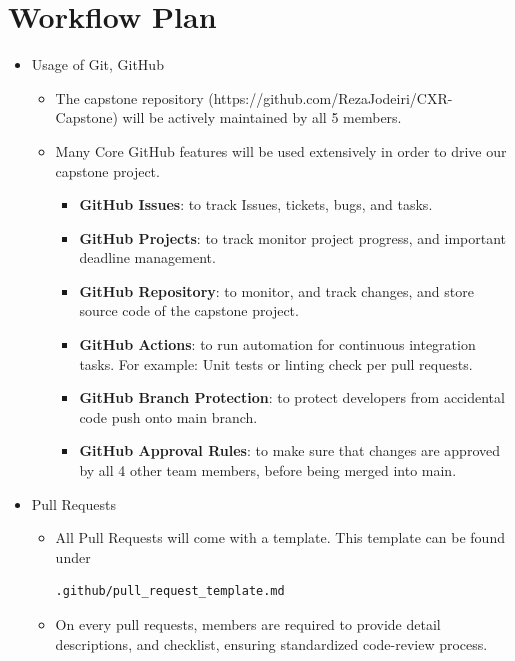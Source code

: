 \documentclass{article}
\begin{document}
\section{Workflow Plan}

\begin{itemize}

  \item Usage of Git, GitHub
  \begin{itemize}
    \item The capstone repository (https://github.com/RezaJodeiri/CXR-Capstone) will be actively maintained by all 5 members.
    \item Many Core GitHub features will be used extensively in order to drive our capstone project.
    \begin{itemize}
      \item \textbf{GitHub Issues}: to track Issues, tickets, bugs, and tasks.
      \item \textbf{GitHub Projects}: to track monitor project progress, and important deadline management.
      \item \textbf{GitHub Repository}: to monitor, and track changes, and store source code of the capstone project.
      \item \textbf{GitHub Actions}: to run automation for continuous integration tasks. For example: Unit tests or linting check per pull requests.
      \item \textbf{GitHub Branch Protection}: to protect developers from accidental code push onto main branch.
      \item \textbf{GitHub Approval Rules}: to make sure that changes are approved by all 4 other team members, before being merged into main.
    \end{itemize}
  \end{itemize}

  \item Pull Requests
  \begin{itemize}
    \item All Pull Requests will come with a template. This template can be found under \begin{verbatim}.github/pull_request_template.md \end{verbatim}
    \item On every pull requests, members are required to provide detail descriptions, and checklist, ensuring standardized code-review process.
  \end{itemize}
  

\end{itemize}
\end{document}
